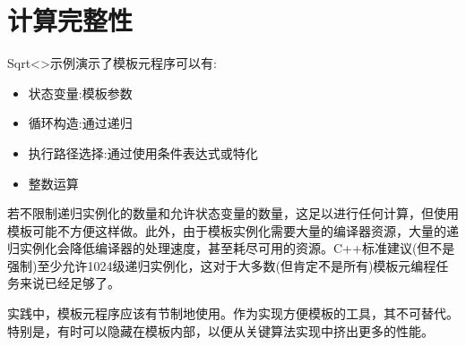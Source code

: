 \section{计算完整性}
Sqrt<>示例演示了模板元程序可以有:

\begin{itemize}
\item 
状态变量:模板参数

\item 
循环构造:通过递归

\item 
执行路径选择:通过使用条件表达式或特化

\item 
整数运算
\end{itemize}

若不限制递归实例化的数量和允许状态变量的数量，这足以进行任何计算，但使用模板可能不方便这样做。此外，由于模板实例化需要大量的编译器资源，大量的递归实例化会降低编译器的处理速度，甚至耗尽可用的资源。C++标准建议(但不是强制)至少允许1024级递归实例化，这对于大多数(但肯定不是所有)模板元编程任务来说已经足够了。

实践中，模板元程序应该有节制地使用。作为实现方便模板的工具，其不可替代。特别是，有时可以隐藏在模板内部，以便从关键算法实现中挤出更多的性能。














































